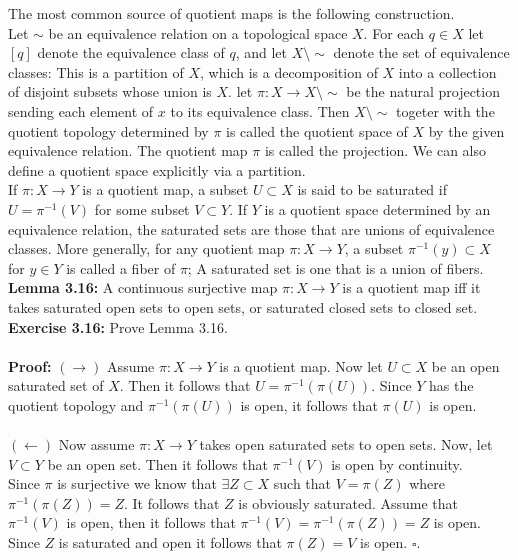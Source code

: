 \documentclass{article}
\begin{document}
  The most common source of quotient maps is the following construction.\\
  Let $\sim$ be an equivalence relation on a topological space $X$. For each $q\in X$ let $[q]$ denote the equivalence class of $q$, and let $X\setminus \sim$ denote the set of equivalence classes: This is a partition of $X$, which is a decomposition of $X$ into a collection of disjoint subsets whose union is $X$. let $\pi:X\to X\setminus\sim$ be the natural projection sending each element of $x$ to its equivalence class. Then $X\setminus \sim$ togeter with the quotient topology determined by $\pi$ is called the quotient space of $X$ by the given equivalence relation. The quotient map $\pi$ is called the projection. We can also define a quotient space explicitly via a partition.\\
  If $\pi:X\to Y$ is a quotient map, a subset $U\subset X$ is said to be saturated if $U=\pi^{-1}(V)$ for some subset $V\subset Y$. If $Y$ is a quotient space determined by an equivalence relation, the saturated sets are those that are unions of equivalence classes. More generally, for any quotient map $\pi:X\to Y$, a subset $\pi^{-1}(y) \subset X$ for $y\in Y$ is called a fiber of $\pi$; A saturated set is one that is a union of fibers.\\
  \textbf{Lemma 3.16:} A continuous surjective map $\pi:X\to Y$ is a quotient map iff it takes saturated open sets to open sets, or saturated closed sets to closed set.\\
  \textbf{Exercise 3.16:} Prove Lemma 3.16.\\
  \\
  \textbf{Proof:} $(\to)$ Assume $\pi:X\to Y$ is a quotient map. Now let $U\subset X$ be an open saturated set of $X$. Then it follows that $U=\pi^{-1}(\pi(U))$. Since $Y$ has the quotient topology and $\pi^{-1}(\pi(U))$ is open, it follows that $\pi(U)$ is open.\\
  \\
  $(\leftarrow)$ Now assume $\pi:X\to Y$ takes open saturated sets to open sets. Now, let $V\subset Y$ be an open set. Then it follows that $\pi^{-1}(V)$ is open by continuity.\\
  Since $\pi$ is surjective we know that $\exists Z\subset X$ such that $V=\pi(Z)$ where $\pi^{-1}(\pi(Z))=Z$. It follows that $Z$ is obviously saturated. Assume that $\pi^{-1}(V)$ is open, then it follows that $\pi^{-1}(V)=\pi^{-1}(\pi(Z))=Z$ is open. Since $Z$ is saturated and open it follows that $\pi(Z)=V$ is open. $\square$.\\
\end{document}
